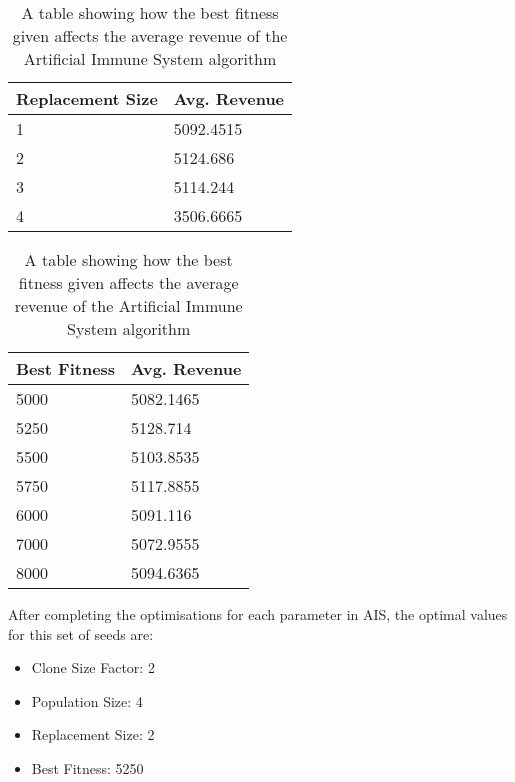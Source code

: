 \documentclass{article}
\begin{document}
\begin{table}[h]
\begin{minipage}[b]{0.45\linewidth}
\centering
\begin{tabular}{@{}ll@{}}
\toprule
Replacement Size  & Avg. Revenue      \\ \midrule
1                 & 5092.4515         \\
2                 & 5124.686          \\
3                 & 5114.244          \\
4                 & 3506.6665         \\ \bottomrule
\end{tabular}
\caption{A table showing how the replacement size affects the average revenue of the Artificial Immune System algorithm}
\label{AIS-Best-Fitness}
\end{minipage}
\hfill
\begin{minipage}[b]{0.45\linewidth}
\centering
\begin{tabular}{@{}ll@{}}
\toprule
Best Fitness      & Avg. Revenue      \\ \midrule
5000              & 5082.1465         \\
5250              & 5128.714          \\
5500              & 5103.8535         \\
5750              & 5117.8855         \\
6000              & 5091.116          \\
7000              & 5072.9555         \\
8000              & 5094.6365         \\ \bottomrule
\end{tabular}
\caption{A table showing how the best fitness given affects the average revenue of the Artificial Immune System algorithm}
\label{AIS-Best-Fitness}
\end{minipage}
\end{table}

After completing the optimisations for each parameter in AIS, the optimal values for this set of seeds are:
\begin{itemize}[label={}]
  \item Clone Size Factor: 2
  \item Population Size: 4
  \item Replacement Size: 2
  \item Best Fitness: 5250
\end{itemize}
\end{document}
